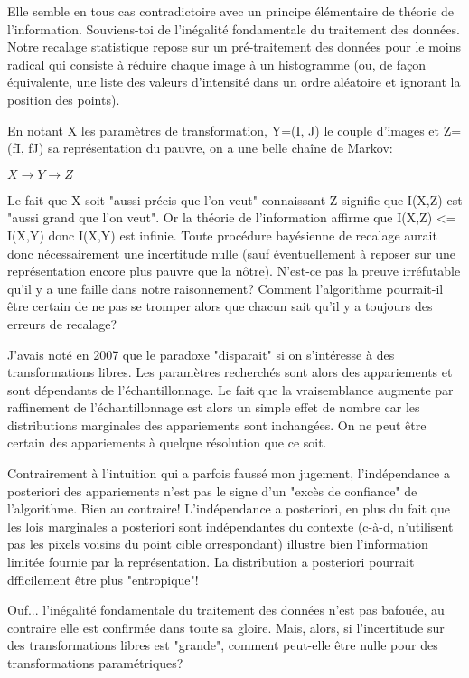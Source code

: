 \documentclass{article}
\begin{document}
Elle semble en tous cas contradictoire avec un principe \'el\'ementaire de th\'eorie de l'information. Souviens-toi de l'in\'egalit\'e fondamentale du traitement des donn\'ees. Notre recalage statistique repose sur un pr\'e-traitement des donn\'ees pour le moins radical qui consiste \`a r\'eduire chaque image \`a un histogramme (ou, de fa\c{c}on \'equivalente, une liste des valeurs d'intensit\'e dans un ordre al\'eatoire et ignorant la position des points). 

En notant X les param\`etres de transformation, Y=(I, J) le couple d'images et Z=(fI, fJ) sa repr\'esentation du pauvre, on a une belle cha\^ine de Markov: 

$X \to Y \to Z$ 

Le fait que X soit "aussi pr\'ecis que l'on veut" connaissant Z signifie que I(X,Z) est "aussi grand que l'on veut". Or la th\'eorie de l'information affirme que I(X,Z) <= I(X,Y) donc I(X,Y) est infinie. Toute proc\'edure bay\'esienne de recalage aurait donc n\'ecessairement une incertitude nulle (sauf \'eventuellement \`a reposer sur une repr\'esentation encore plus pauvre que la n\^otre). N'est-ce pas la preuve irr\'efutable qu'il y a une faille dans notre raisonnement? Comment l'algorithme pourrait-il \^etre certain de ne pas se tromper alors que chacun sait qu'il y a toujours des erreurs de recalage? 

J'avais not\'e en 2007 que le paradoxe "disparait" si on s'int\'eresse \`a des transformations libres. Les param\`etres recherch\'es sont alors des appariements et sont d\'ependants de l'\'echantillonnage. Le fait que la vraisemblance augmente par raffinement de l'\'echantillonnage est alors un simple effet de nombre car les distributions marginales des appariements sont inchang\'ees. On ne peut \^etre certain des appariements \`a quelque r\'esolution que ce soit. 

Contrairement \`a l'intuition qui a parfois fauss\'e mon jugement, l'ind\'ependance a posteriori des appariements n'est pas le signe d'un "exc\`es de confiance" de l'algorithme. Bien au contraire! L'ind\'ependance a posteriori, en plus du fait que les lois marginales a posteriori sont ind\'ependantes du contexte (c-\`a-d, n'utilisent pas les pixels voisins du point cible orrespondant) illustre bien l'information limit\'ee fournie par la repr\'esentation. La distribution a posteriori pourrait dfficilement \^etre plus "entropique"! 

Ouf... l'in\'egalit\'e fondamentale du traitement des donn\'ees n'est pas bafou\'ee, au contraire elle est confirm\'ee dans toute sa gloire.  Mais, alors, si l'incertitude sur des transformations libres est "grande", comment peut-elle \^etre nulle pour des transformations param\'etriques? 
\end{document}
